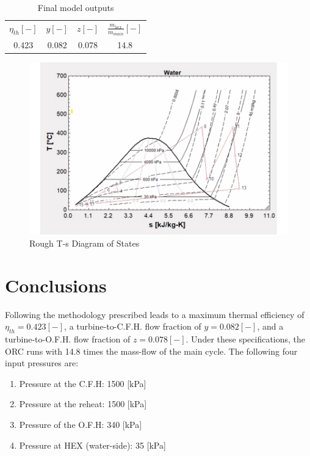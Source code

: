 \documentclass[10pt,cleanfoot]{asme2ej}
\begin{document}
\begin{table}[t]
\caption{Final model outputs}
\begin{center}
\label{table_ASME}
\begin{tabular}{c c c c}
& & & \\ %
\hline
$\eta_{th} [-]$ & $y [-]$ & $z [-]$ & $\frac{m_{hex}}{m_{main}} [-]$ \\
\hline
0.423 & 0.082 & 0.078 & 14.8 \\
\hline
\end{tabular}
\end{center}
\end{table}

\begin{figure} 
\centerline{\includegraphics[width=4.5in]{figure/ts.jpg}}
\caption{Rough T-s Diagram of States}
\label{ts.jpg}
\end{figure}

\section{Conclusions}

Following the methodology prescribed leads to a maximum thermal efficiency of $\eta_{th} = 0.423 [-]$, a turbine-to-C.F.H. flow fraction of $y = 0.082 [-]$, and a turbine-to-O.F.H. flow fraction of $z = 0.078 [-]$. Under these specifications, the ORC runs with 14.8 times the mass-flow of the main cycle. The following four input pressures are:

\begin{enumerate}
\item
Pressure at the C.F.H: 1500 [kPa]
\item
Pressure at the reheat: 1500 [kPa]
\item
Pressure of the O.F.H: 340 [kPa]
\item
Pressure at HEX (water-side): 35 [kPa]
\end{enumerate}
\end{document}
